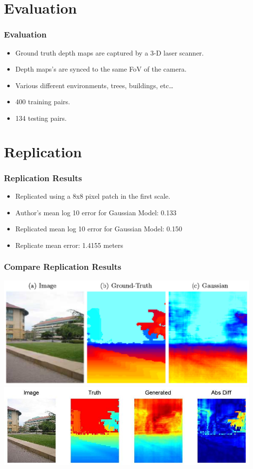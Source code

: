 \documentclass[handout]{beamer}
\newcommand{\vitem}{\vfill\item}
\begin{document}
\section{Evaluation}
\begin{frame}[t]\frametitle{Evaluation}
    \begin{itemize}
        \vitem Ground truth depth maps are captured by a 3-D laser scanner.
        \vitem Depth maps's are synced to the same FoV of the camera.
        \vitem Various different environments, trees, buildings, etc\dots
        \vitem 400 training pairs.
        \vitem 134 testing pairs.
    \end{itemize}
\end{frame}

\section{Replication}
\begin{frame}[t]\frametitle{Replication Results}
    \begin{itemize}
        \item Replicated using a 8x8 pixel patch in the first scale.
        \vitem Author's mean log 10 error for Gaussian Model: 0.133
        \vitem Replicated mean log 10 error for Gaussian Model: 0.150
        \vitem Replicate mean error: 1.4155 meters
    \end{itemize}
\end{frame}

\begin{frame}[t]\frametitle{Compare Replication Results}
    \includegraphics[width=\linewidth]{compare1.png} \\
    \vfill\includegraphics[width=\linewidth]{compare1.jpg}
\end{frame}
\end{document}
